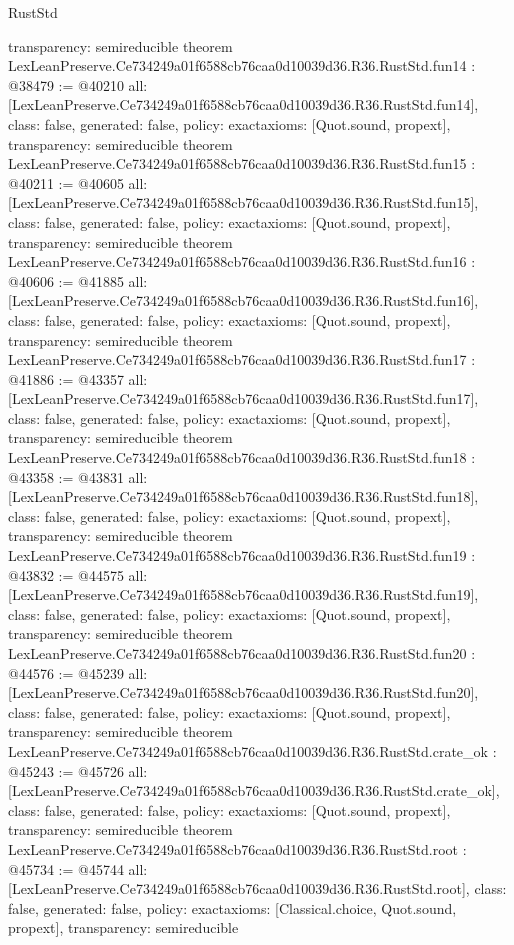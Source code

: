 \begin{lexlean}{RustStd}
\begin{coremodule}
{  transparency: semireducible
}
theorem LexLeanPreserve.Ce734249a01f6588cb76caa0d10039d36.R36.RustStd.fun14 : @38479 := @40210 {
  all: [LexLeanPreserve.Ce734249a01f6588cb76caa0d10039d36.R36.RustStd.fun14],
  class: false,
  generated: false,
  policy: exact{axioms: [Quot.sound, propext]},
  transparency: semireducible
}
theorem LexLeanPreserve.Ce734249a01f6588cb76caa0d10039d36.R36.RustStd.fun15 : @40211 := @40605 {
  all: [LexLeanPreserve.Ce734249a01f6588cb76caa0d10039d36.R36.RustStd.fun15],
  class: false,
  generated: false,
  policy: exact{axioms: [Quot.sound, propext]},
  transparency: semireducible
}
theorem LexLeanPreserve.Ce734249a01f6588cb76caa0d10039d36.R36.RustStd.fun16 : @40606 := @41885 {
  all: [LexLeanPreserve.Ce734249a01f6588cb76caa0d10039d36.R36.RustStd.fun16],
  class: false,
  generated: false,
  policy: exact{axioms: [Quot.sound, propext]},
  transparency: semireducible
}
theorem LexLeanPreserve.Ce734249a01f6588cb76caa0d10039d36.R36.RustStd.fun17 : @41886 := @43357 {
  all: [LexLeanPreserve.Ce734249a01f6588cb76caa0d10039d36.R36.RustStd.fun17],
  class: false,
  generated: false,
  policy: exact{axioms: [Quot.sound, propext]},
  transparency: semireducible
}
theorem LexLeanPreserve.Ce734249a01f6588cb76caa0d10039d36.R36.RustStd.fun18 : @43358 := @43831 {
  all: [LexLeanPreserve.Ce734249a01f6588cb76caa0d10039d36.R36.RustStd.fun18],
  class: false,
  generated: false,
  policy: exact{axioms: [Quot.sound, propext]},
  transparency: semireducible
}
theorem LexLeanPreserve.Ce734249a01f6588cb76caa0d10039d36.R36.RustStd.fun19 : @43832 := @44575 {
  all: [LexLeanPreserve.Ce734249a01f6588cb76caa0d10039d36.R36.RustStd.fun19],
  class: false,
  generated: false,
  policy: exact{axioms: [Quot.sound, propext]},
  transparency: semireducible
}
theorem LexLeanPreserve.Ce734249a01f6588cb76caa0d10039d36.R36.RustStd.fun20 : @44576 := @45239 {
  all: [LexLeanPreserve.Ce734249a01f6588cb76caa0d10039d36.R36.RustStd.fun20],
  class: false,
  generated: false,
  policy: exact{axioms: [Quot.sound, propext]},
  transparency: semireducible
}
theorem LexLeanPreserve.Ce734249a01f6588cb76caa0d10039d36.R36.RustStd.crate_ok : @45243 := @45726 {
  all: [LexLeanPreserve.Ce734249a01f6588cb76caa0d10039d36.R36.RustStd.crate_ok],
  class: false,
  generated: false,
  policy: exact{axioms: [Quot.sound, propext]},
  transparency: semireducible
}
theorem LexLeanPreserve.Ce734249a01f6588cb76caa0d10039d36.R36.RustStd.root : @45734 := @45744 {
  all: [LexLeanPreserve.Ce734249a01f6588cb76caa0d10039d36.R36.RustStd.root],
  class: false,
  generated: false,
  policy: exact{axioms: [Classical.choice, Quot.sound, propext]},
  transparency: semireducible
}


\end{coremodule}
\end{lexlean}
